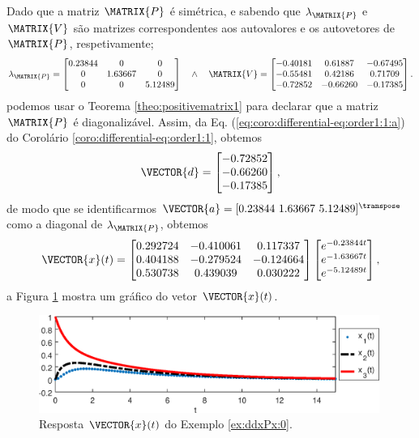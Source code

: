 \begin{SolutionT}
\label{ex:dxPx:0:sol1}
Dado que a matriz $\MATRIX{P}$ é simétrica, e
sabendo que $\lambda_{\MATRIX{P}}$ e $\MATRIX{V}$ são matrizes correspondentes aos autovalores e os autovetores de $\MATRIX{P}$,
respetivamente; 
\begin{equation}
\lambda_{\MATRIX{P}}=
\begin{bmatrix}
   0.23844 &       0 &       0\\
         0 & 1.63667 &       0\\
         0 &       0 & 5.12489
\end{bmatrix}
\quad \wedge \quad
\MATRIX{V}=
\begin{bmatrix}
  -0.40181 & 0.61887 &-0.67495\\
  -0.55481 & 0.42186 & 0.71709\\
  -0.72852 &-0.66260 &-0.17385
\end{bmatrix}.
\end{equation}
podemos usar o Teorema \ref{theo:positivematrix1} para declarar que a matriz $\MATRIX{P}$ é diagonalizável. 
Assim, da Eq. (\ref{eq:coro:differential-eq:order1:1:a}) do Corolário \ref{coro:differential-eq:order1:1},
obtemos
\begin{equation}
\VECTOR{d}=
\begin{bmatrix}
  -0.72852\\
  -0.66260\\
  -0.17385
\end{bmatrix},
\end{equation}
de modo que se identificarmos $\VECTOR{a}=[0.23844~ 1.63667~ 5.12489]^{\transpose}$ 
como a diagonal de $\lambda_{\MATRIX{P}}$,
obtemos
\begin{equation}
 \VECTOR{x}(t)= 
\begin{bmatrix}
   0.292724 &-0.410061 & 0.117337\\
   0.404188 &-0.279524 &-0.124664\\
   0.530738 & 0.439039 & 0.030222
\end{bmatrix}
\begin{bmatrix}
   e^{-0.23844 t}\\
   e^{-1.63667 t}\\
   e^{-5.12489 t}
\end{bmatrix},
\end{equation}
a Figura \ref{fig:ex:dxPx:0} mostra um gráfico do vetor $\VECTOR{x}(t)$.
\end{SolutionT}
     \begin{figure}[!h]
         \centering
         \includegraphics[width=0.99\textwidth]{chapters/differential-eq/mfiles/primeiroorder/primeirooder1.eps}
         \caption{Resposta $\VECTOR{x}(t)$ do Exemplo \ref{ex:ddxPx:0}.}
         \label{fig:ex:dxPx:0}
     \end{figure}
